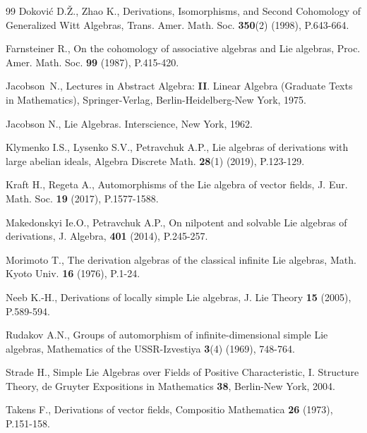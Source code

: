 \documentclass[12pt,a4paper]{amsart}
\theoremstyle{plain}
\begin{document}
\begin{thebibliography}{99}
		   Doković D.Ž.,  Zhao K., Derivations, Isomorphisms, and Second Cohomology of Generalized Witt Algebras, Trans. Amer. Math. Soc. \textbf{350}(2) (1998), P.643-664.
		
	 Farnsteiner R., On the cohomology of associative algebras and Lie algebras,
	Proc. Amer. Math. Soc.  \textbf{99} (1987), P.415-420.
		
		 Jacobson~N., Lectures in Abstract Algebra: \textbf{II}. Linear Algebra (Graduate Texts in Mathematics), Springer-Verlag, Berlin-Heidelberg-New York, 1975. %
		
		 Jacobson N., Lie Algebras. Interscience, New York, 1962.
		
		
		
		  Klymenko I.S.,  Lysenko S.V.,  Petravchuk A.P., Lie algebras of derivations with large abelian ideals, Algebra Discrete Math. \textbf{28}(1) (2019), P.123-129.
		
	
		

		
				
		
	 	Kraft H., Regeta A., Automorphisms of the Lie algebra of vector fields, J. Eur. Math. Soc. \textbf{19} (2017), P.1577-1588.
		
		 Makedonskyi Ie.O., Petravchuk A.P., On nilpotent and solvable Lie algebras of derivations, J. Algebra, \textbf{401} (2014), P.245-257.
		
			 Morimoto T., The derivation algebras of the classical infinite Lie algebras, Math.	Kyoto Univ. \textbf{16} (1976), P.1-24.
		
		 Neeb K.-H., Derivations of locally simple Lie algebras, J. Lie Theory \textbf{15} (2005), P.589-594.
		
		

		
		
		  Rudakov A.N., Groups of automorphism of infinite-dimensional simple Lie algebras, Mathematics of the USSR-Izvestiya \textbf{3}(4) (1969), 748-764.    
		
		
		


		 Strade H., Simple Lie Algebras over Fields of Positive Characteristic, I. Structure Theory, de Gruyter Expositions in Mathematics \textbf{38}, Berlin-New York, 2004.
		
	Takens F., Derivations of vector fields, Compositio Mathematica \textbf{26} (1973), P.151-158.


	
	\end{thebibliography}
	
	
\end{document}
